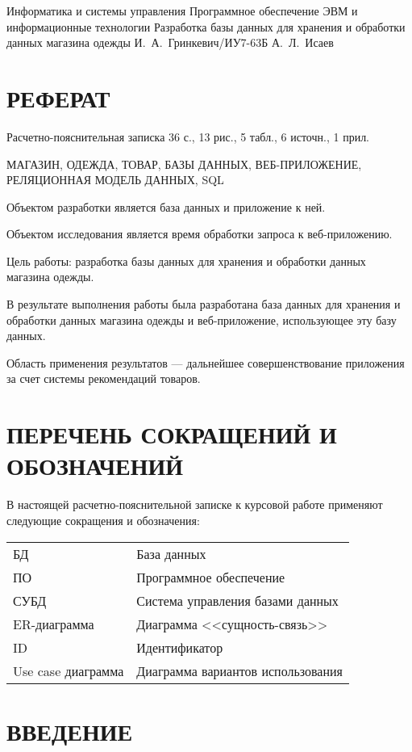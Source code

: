\documentclass{bmstu}
\begin{document}
\makecourseworktitle
    {Информатика и системы управления}
    {Программное обеспечение ЭВМ и информационные технологии}
    {Разработка базы данных для хранения и обработки данных магазина одежды}
    {И.~А.~Гринкевич/ИУ7-63Б}
    {А.~Л.~Исаев}
    {}
    
\setcounter{page}{3}

{\centering \chapter*{РЕФЕРАТ}}

Расчетно-пояснительная записка 36 с., 13 рис., 5 табл., 6 источн., 1 прил.

\noindent МАГАЗИН, ОДЕЖДА, ТОВАР, БАЗЫ ДАННЫХ, ВЕБ-ПРИЛОЖЕНИЕ, РЕЛЯЦИОННАЯ МОДЕЛЬ ДАННЫХ, SQL

Объектом разработки является база данных и приложение к ней.

Объектом исследования является время обработки запроса к веб-приложению.

Цель работы: разработка базы данных для хранения и обработки данных магазина одежды.

В результате выполнения работы была разработана база данных для хранения и обработки данных магазина одежды и веб-приложение, использующее эту базу данных.

Область применения результатов --- дальнейшее совершенствование приложения за счет системы рекомендаций товаров.

{\centering \maketableofcontents}

{\centering \chapter*{ПЕРЕЧЕНЬ СОКРАЩЕНИЙ И ОБОЗНАЧЕНИЙ}}

В настоящей расчетно-пояснительной записке к курсовой работе применяют следующие сокращения и обозначения:

\begin{table}[H]
\begin{tabular}{p{5cm}p{10.5cm}}
БД & База данных
\tabularnewline
ПО & Программное обеспечение
\tabularnewline
СУБД & Система управления базами данных
\tabularnewline
ER-диаграмма & Диаграмма <<сущность-связь>>
\tabularnewline
ID & Идентификатор
\tabularnewline
Use case диаграмма & Диаграмма вариантов использования
\tabularnewline
\end{tabular}
\end{table}

{\centering \chapter*{ВВЕДЕНИЕ}}
\end{document}
